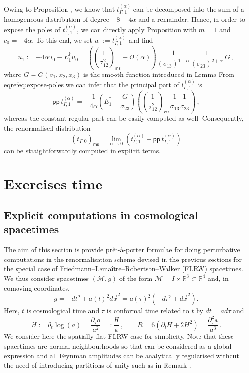 \documentclass[10pt]{book}
\newcommand{\pp}{\mathsf{pp}}
\newcommand{\ms}{\mathsf{ms}}
\newcommand{\Mcal}{\mathcal{M}}
\theoremstyle{break}
\begin{document}
Owing to Proposition %
, we know that $t_{\Gamma,1}^{(\alpha)}$ can be decomposed into the sum of a homogeneous distribution of degree $-8-4\alpha$ and a remainder. Hence, in order to expose the poles of $t_{\Gamma,1}^{(\alpha)}$,    
we can directly apply Proposition %
with $m=1$ and $c_0 = -4\alpha$. To this end, we set $u_0 := t_{\Gamma,1}^{(\alpha)}$ 
and find 
\[
u_1 := -4\alpha u_0 - E^\dagger_1 u_0   = \left(\left(\frac{1}{\sigma_{12}^{2}} \right)_\ms + O(\alpha) \right) \frac{1}{(\sigma_{13})^{1+\alpha}} \frac{1}{(\sigma_{23})^{2+\alpha}} \,G\,,
\]
where $G=G(x_1,x_2,x_3)$ is the smooth function introduced in Lemma %
From eqref{eq:expose-poles} we can infer that the principal part of $t_{\Gamma,1}^{(\alpha)}$ is
\[
\pp \,t_{\Gamma,1}^{(\alpha)} = -\frac{1}{4\alpha} \left(E^\dagger_1 +\frac{G}{\sigma_{23}}\right) \left( \left(\frac{1}{\sigma_{12}^2}\right)_\ms\frac{1}{\sigma_{13}} \frac{1}{\sigma_{23}}\right)\,,
\]
whereas the constant regular part can be easily computed as well. Consequently, the renormalised distribution
\[
(t_{\Gamma,0})_\ms = \lim_{\alpha\to 0} \left( t_{\Gamma,1}^{(\alpha)} - \pp \,t_{\Gamma,1}^{(\alpha)}   \right)
\]
can be straightforwardly computed in explicit terms.



\chapter{Exercises time}


\section{Explicit computations in cosmological spacetimes}


The aim of this section is provide pr\^et-\`a-porter formulae for doing perturbative computations in the renormalisation scheme devised in the previous sections for the special case of Friedmann--Lema\^itre--Robertson--Walker (FLRW) spacetimes. We thus consider spacetimes $(\Mcal,g)$ of the form $\Mcal=I\times \mathbb{R}^3\subset \mathbb{R}^4$ and, in comoving coordinates,
$$g= -dt^2 + a(t)^2 d\vec{x}^2=a(\tau)^2\left(-d\tau^2+d\vec{x}^2\right).$$
Here, $t$ is cosmological time and $\tau$ is conformal time related to $t$ by $dt = a d\tau$ and 
\begin{equation}%
H:=\partial_t \log (a) = \frac{\partial_\tau a}{a^2}=:\frac{H}{a}\,,\qquad R=6(\partial_t H + 2 H^2)=\frac{\partial^2_\tau a}{a^3}\,.\end{equation}
We consider here the spatially flat FLRW case for simplicity. Note that these spacetimes are normal neighbourhoods so that %
can be considered as a global expression and all Feynman amplitudes can be analytically regularised without the need of introducing partitions of unity such as in Remark %
.
\end{document}
